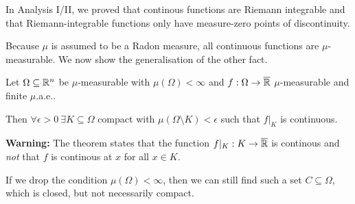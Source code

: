 In Analysis I/II, we proved that continous functions are Riemann integrable and that Riemann-integrable functions only have measure-zero points of discontinuity.

Because $\mu$ is assumed to be a Radon measure, all continuous functions are $\mu$-measurable.
We now show the generalisation of the other fact.

\begin{thm}
  Let $\Omega \subseteq \mathbb{R}^{n}$ be $\mu$-measurable 
  with $\mu(\Omega) < \infty$ and $f: \Omega \to \overline{\mathbb{R}}$ $\mu$-measurable and finite $\mu$.a.e..

  Then $\forall  \epsilon > 0\ \exists K \subseteq \Omega$ compact with $\mu(\Omega \setminus K) < \epsilon$ such that $f|_K$ is continuous.


\end{thm}
\begin{rem}[]
  \textbf{Warning:} The theorem states that the function $f|_K: K \to \overline{\mathbb{R}}$ is continous and \emph{not} that $f$ is continous at $x$ for all $x \in K$.

  If we drop the condition $\mu(\Omega) < \infty$, then we can still find such a set $C \subseteq \Omega$, which is closed, but not necessarily compact.
\end{rem}
